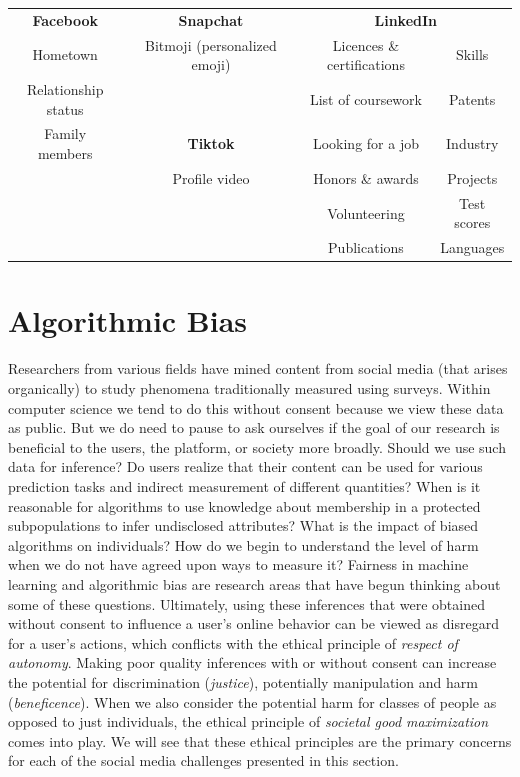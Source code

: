 \documentclass[11pt]{article} %
\begin{document}
\begin{table}[tb]
\begin{tabular}{clclcc}
\textbf{Facebook}   &  & \textbf{Snapchat}            &  & \multicolumn{2}{c}{\textbf{LinkedIn}}    \\ \cline{1-1} \cline{3-3} \cline{5-6} 
Hometown            &  & Bitmoji (personalized emoji) &  & Licences \& certifications & Skills      \\
Relationship status &  &                              &  & List of coursework         & Patents     \\
Family members      &  & \textbf{Tiktok}              &  & Looking for a job          & Industry    \\ \cline{3-3}
                    &  & Profile video                &  & Honors \& awards           & Projects    \\
                    &  &                              &  & Volunteering               & Test scores \\
                    &  &                              &  & Publications               & Languages  
        \end{tabular} 
\end{table}


\section{Algorithmic Bias}
\label{sec:bias} 

Researchers from various fields have mined content from social media (that arises organically) to study phenomena traditionally measured using surveys. Within computer science we tend to do this without consent because we view these data as public. But we do need to pause to ask ourselves if the goal of our research is beneficial to the users, the platform, or society more broadly. Should we use such data for inference? Do users realize that their content can be used for various prediction tasks and indirect measurement of different quantities? When is it reasonable for algorithms to use knowledge about membership in a protected subpopulations to infer undisclosed attributes? What is the impact of biased algorithms on individuals? How do we begin to understand the level of harm when we do not have agreed upon ways to measure it? Fairness in machine learning and algorithmic bias are research areas that have begun thinking about some of these questions. Ultimately, using these inferences that were obtained without consent to influence a user's online behavior can be viewed as disregard for a user's actions, which conflicts with the ethical principle of \textit{respect of autonomy}. Making poor quality inferences with or without consent can increase the potential for discrimination (\textit{justice}), potentially manipulation and harm (\textit{beneficence}). When we also consider the potential harm for classes of people as opposed to just individuals, the ethical principle of \textit{societal good maximization} comes into play. We will see that these ethical principles are the primary concerns for each of the social media challenges presented in this section.
\end{document}
